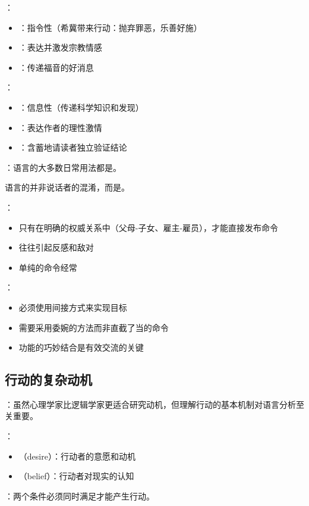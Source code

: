 \begin{examplebox}[title=不同文体的功能融合]
：
\begin{itemize}
  \item {}：指令性（希冀带来行动：抛弃罪恶，乐善好施）
  \item {}：表达并激发宗教情感
  \item {}：传递福音的好消息
\end{itemize}

：
\begin{itemize}
  \item {}：信息性（传递科学知识和发现）
  \item {}：表达作者的理性激情
  \item {}：含蓄地请读者独立验证结论
\end{itemize}

：语言的大多数日常用法都是。
\end{examplebox}

\begin{theorembox}[title=多功能用法的必要性]
语言的并非说话者的混淆，而是。

：
\begin{itemize}
  \item 只有在明确的权威关系中（父母-子女、雇主-雇员），才能直接发布命令
  \item {}往往引起反感和敌对
  \item 单纯的命令经常
\end{itemize}

：
\begin{itemize}
  \item 必须使用间接方式来实现目标
  \item 需要采用委婉的方法而非直截了当的命令
  \item 功能的巧妙结合是有效交流的关键
\end{itemize}
\end{theorembox}

\subsection{行动的复杂动机}

\begin{theorembox}[title=行动的心理学基础]
：虽然心理学家比逻辑学家更适合研究动机，但理解行动的基本机制对语言分析至关重要。

：
\begin{itemize}
  \item {}（desire）：行动者的意愿和动机
  \item {}（belief）：行动者对现实的认知
\end{itemize}

：两个条件必须同时满足才能产生行动。
\end{theorembox}

